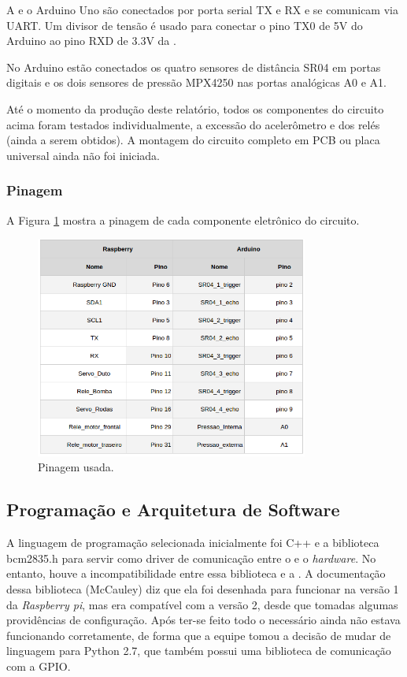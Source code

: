A  e o Arduino Uno são conectados por porta serial TX e RX e se comunicam via \textsf{UART}. Um divisor de tensão é usado para conectar o pino TX0 de 5V do Arduino ao pino RXD de 3.3V da .

No Arduino estão conectados os quatro sensores de distância SR04 em portas digitais e os dois sensores de pressão MPX4250 nas portas analógicas A0 e A1.

Até o momento da produção deste relatório, todos os componentes do circuito acima foram testados individualmente, a excessão do acelerômetro e dos relés (ainda a serem obtidos). A montagem do circuito completo em PCB ou placa universal ainda não foi iniciada.

\subsubsection{Pinagem}
A Figura \ref{fig:pinout} mostra a pinagem de cada componente eletrônico do circuito.
\par
\begin{figure}[h]
  \centering
  \includegraphics[width=0.8\textwidth]{figures/pinout.png}
  \caption{Pinagem usada.}
  \label{fig:pinout}
\end{figure}
\FloatBarrier
\par

\subsection{Programação e Arquitetura de Software}
A linguagem de programação selecionada inicialmente foi C++ e a biblioteca \textsf{bcm2835.h} para servir como driver de comunicação entre o \software e o \textit{hardware}. No entanto, houve a incompatibilidade entre essa biblioteca e a . A documentação dessa biblioteca (McCauley) diz que ela foi desenhada para funcionar na versão 1 da \textit{Raspberry pi}, mas era compatível com a versão 2, desde que tomadas algumas providências de configuração. Após ter-se feito todo o necessário ainda não estava funcionando corretamente, de forma que a equipe tomou a decisão de mudar de linguagem para \textsf{Python 2.7}, que também possui uma biblioteca de comunicação com a GPIO.

